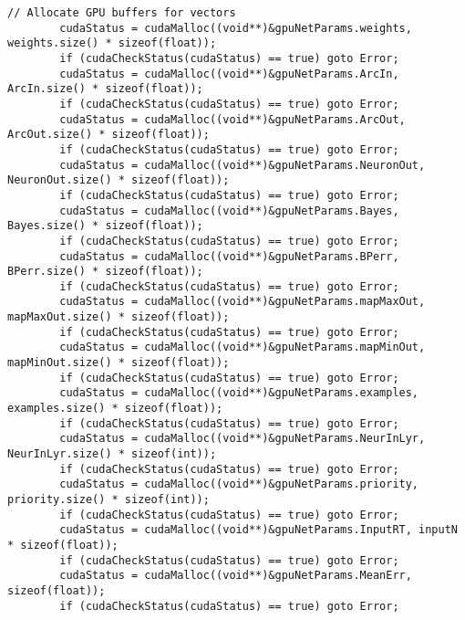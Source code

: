 \documentclass[10pt,a4paper]{article}
\begin{document}
\begin{lstlisting}[style=mycuda, caption= classe di interfaccia alla GPU, captionpos=b]
		// Allocate GPU buffers for vectors    
		cudaStatus = cudaMalloc((void**)&gpuNetParams.weights, weights.size() * sizeof(float));
		if (cudaCheckStatus(cudaStatus) == true) goto Error;
		cudaStatus = cudaMalloc((void**)&gpuNetParams.ArcIn, ArcIn.size() * sizeof(float));
		if (cudaCheckStatus(cudaStatus) == true) goto Error;
		cudaStatus = cudaMalloc((void**)&gpuNetParams.ArcOut, ArcOut.size() * sizeof(float));
		if (cudaCheckStatus(cudaStatus) == true) goto Error;
		cudaStatus = cudaMalloc((void**)&gpuNetParams.NeuronOut, NeuronOut.size() * sizeof(float));
		if (cudaCheckStatus(cudaStatus) == true) goto Error;
		cudaStatus = cudaMalloc((void**)&gpuNetParams.Bayes, Bayes.size() * sizeof(float));
		if (cudaCheckStatus(cudaStatus) == true) goto Error;
		cudaStatus = cudaMalloc((void**)&gpuNetParams.BPerr, BPerr.size() * sizeof(float));
		if (cudaCheckStatus(cudaStatus) == true) goto Error;
		cudaStatus = cudaMalloc((void**)&gpuNetParams.mapMaxOut, mapMaxOut.size() * sizeof(float));
		if (cudaCheckStatus(cudaStatus) == true) goto Error;
		cudaStatus = cudaMalloc((void**)&gpuNetParams.mapMinOut, mapMinOut.size() * sizeof(float));
		if (cudaCheckStatus(cudaStatus) == true) goto Error;
		cudaStatus = cudaMalloc((void**)&gpuNetParams.examples, examples.size() * sizeof(float));
		if (cudaCheckStatus(cudaStatus) == true) goto Error;
		cudaStatus = cudaMalloc((void**)&gpuNetParams.NeurInLyr, NeurInLyr.size() * sizeof(int));
		if (cudaCheckStatus(cudaStatus) == true) goto Error;
		cudaStatus = cudaMalloc((void**)&gpuNetParams.priority, priority.size() * sizeof(int));
		if (cudaCheckStatus(cudaStatus) == true) goto Error;
		cudaStatus = cudaMalloc((void**)&gpuNetParams.InputRT, inputN * sizeof(float));
		if (cudaCheckStatus(cudaStatus) == true) goto Error;
		cudaStatus = cudaMalloc((void**)&gpuNetParams.MeanErr, sizeof(float));
		if (cudaCheckStatus(cudaStatus) == true) goto Error;



\end{lstlisting}
\end{document}
